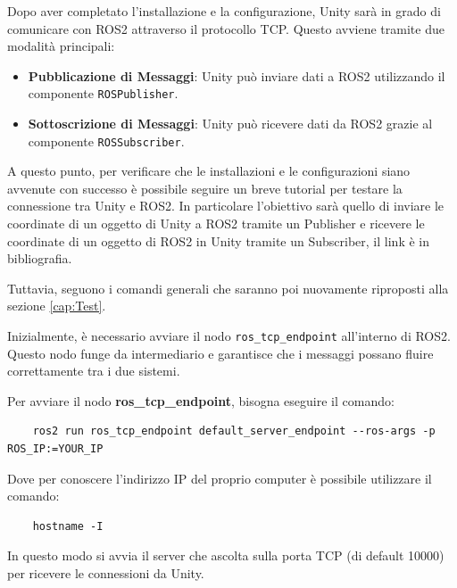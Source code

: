 \documentclass[11pt]{report}
\begin{document}

Dopo aver completato l’installazione e la configurazione, Unity sarà in grado di comunicare con ROS2 attraverso il protocollo TCP. Questo avviene tramite due modalità principali:
    
\begin{itemize}
    \item \textbf{Pubblicazione di Messaggi}: Unity può inviare dati a ROS2 utilizzando il componente \texttt{ROSPublisher}.
    \item \textbf{Sottoscrizione di Messaggi}: Unity può ricevere dati da ROS2 grazie al componente \texttt{ROSSubscriber}.
\end{itemize}

A questo punto, per verificare che le installazioni e le configurazioni siano avvenute con successo è possibile seguire un breve tutorial per testare la connessione tra Unity e ROS2.
In particolare l'obiettivo sarà quello di inviare le coordinate di un oggetto di Unity a ROS2 tramite un Publisher e ricevere le coordinate di un oggetto di ROS2 in Unity tramite un Subscriber, il link è in bibliografia.\cite{Test-Connessione-ROS-Unity}

Tuttavia, seguono i comandi generali che saranno poi nuovamente riproposti alla sezione \ref{cap:Test}.

Inizialmente, è necessario avviare il nodo \texttt{ros\_tcp\_endpoint} all’interno di ROS2. Questo nodo funge da intermediario e garantisce che i messaggi possano fluire correttamente tra i due sistemi.
    
Per avviare il nodo \textbf{ros\_tcp\_endpoint}, bisogna eseguire il comando:

\begin{verbatim}
    ros2 run ros_tcp_endpoint default_server_endpoint --ros-args -p ROS_IP:=YOUR_IP
\end{verbatim}

Dove per conoscere l'indirizzo IP del proprio computer è possibile utilizzare il comando: 
\begin{verbatim}
    hostname -I
\end{verbatim}

In questo modo si avvia il server che ascolta sulla porta TCP (di default 10000) per ricevere le connessioni da Unity.
\end{document}
